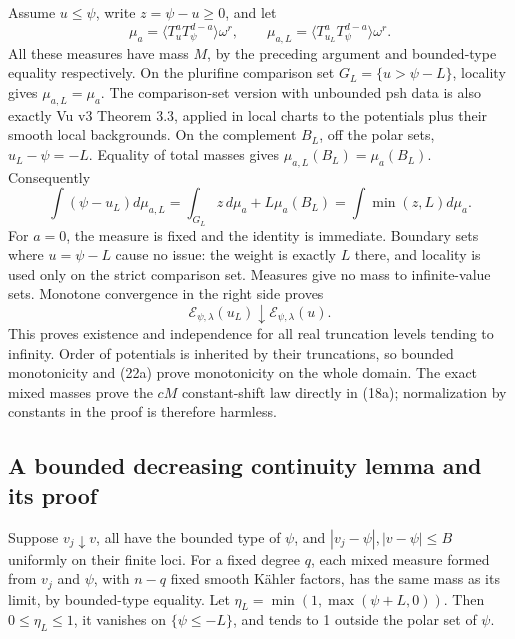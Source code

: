 \documentclass[
  11pt,
]{article}
\begin{document}
Assume \(u\leq\psi\), write \(z=\psi-u\geq0\), and let \[
\mu_a=\langle T_u^aT_\psi^{d-a}\rangle\omega^r,
\qquad
\mu_{a,L}=\langle T_{u_L}^aT_\psi^{d-a}\rangle\omega^r.
\] All these measures have mass \(M\), by the preceding argument and
bounded-type equality respectively. On the plurifine comparison set
\(G_L=\{u>\psi-L\}\), locality gives \(\mu_{a,L}=\mu_a\). The
comparison-set version with unbounded psh data is also exactly Vu v3
Theorem 3.3, applied in local charts to the potentials plus their smooth
local backgrounds. On the complement \(B_L\), off the polar sets,
\(u_L-\psi=-L\). Equality of total masses gives
\(\mu_{a,L}(B_L)=\mu_a(B_L)\). Consequently \[
\int(\psi-u_L)d\mu_{a,L}
=\int_{G_L}z\,d\mu_a+L\mu_a(B_L)
=\int\min(z,L)d\mu_a.
\tag{21a}
\] For \(a=0\), the measure is fixed and the identity is immediate.
Boundary sets where \(u=\psi-L\) cause no issue: the weight is exactly
\(L\) there, and locality is used only on the strict comparison set.
Measures give no mass to infinite-value sets. Monotone convergence in
the right side proves \[
\mathcal E_{\psi,\lambda}(u_L)\downarrow\mathcal E_{\psi,\lambda}(u).
\tag{22a}
\] This proves existence and independence for all real truncation levels
tending to infinity. Order of potentials is inherited by their
truncations, so bounded monotonicity and (22a) prove monotonicity on the
whole domain. The exact mixed masses prove the \(cM\) constant-shift law
directly in (18a); normalization by constants in the proof is therefore
harmless.

\subsection{A bounded decreasing continuity lemma and its
proof}\label{a-bounded-decreasing-continuity-lemma-and-its-proof}

Suppose \(v_j\downarrow v\), all have the bounded type of \(\psi\), and
\(|v_j-\psi|,|v-\psi|\leq B\) uniformly on their finite loci. For a
fixed degree \(q\), each mixed measure formed from \(v_j\) and \(\psi\),
with \(n-q\) fixed smooth Kähler factors, has the same mass as its
limit, by bounded-type equality. Let \(\eta_L=\min(1,\max(\psi+L,0))\).
Then \(0\leq\eta_L\leq1\), it vanishes on \(\{\psi\leq-L\}\), and tends
to 1 outside the polar set of \(\psi\).
\end{document}
